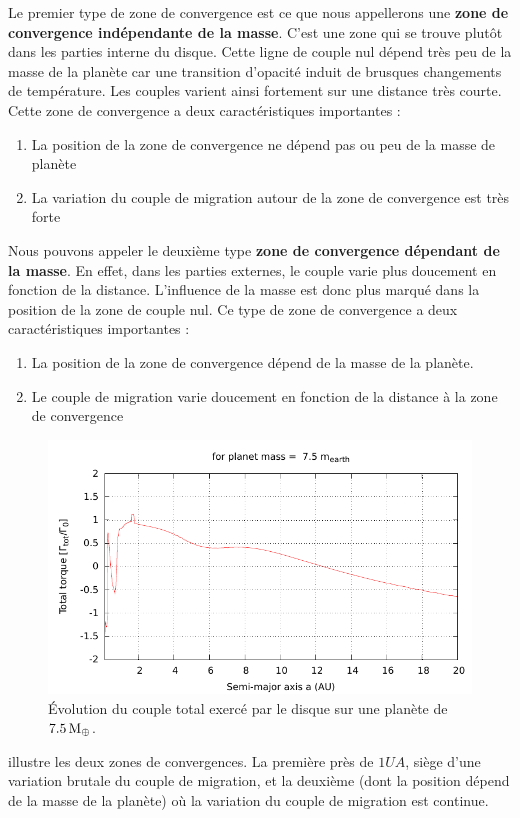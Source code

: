 Le premier type de zone de convergence est ce que nous appellerons une \textbf{zone de convergence indépendante de la masse}. C'est une
zone qui se trouve plutôt dans les parties interne du disque. Cette ligne de couple nul dépend très peu de la masse de la
planète car une transition d'opacité induit de brusques changements de température. Les couples varient ainsi fortement sur une
distance très courte. Cette zone de convergence a deux caractéristiques importantes : 
\begin{enumerate}
\item La position de la zone de convergence ne dépend pas ou peu de la masse de planète
\item La variation du couple de migration autour de la zone de convergence est très forte
\end{enumerate}

Nous pouvons appeler le deuxième type \textbf{zone de convergence dépendant de la masse}. En effet, dans les parties externes, le
couple varie plus doucement en fonction de la distance. L'influence de la masse est donc plus marqué dans la position de la zone
de couple nul. Ce type de zone de convergence a deux caractéristiques importantes : 
\begin{enumerate}
\item La position de la zone de convergence dépend de la masse de la planète. 
\item Le couple de migration varie doucement en fonction de la distance à la zone de convergence
\end{enumerate}

\begin{figure}[htb]
\centering
\includegraphics[width=0.75\linewidth]{figure/total_torque_fixed_m.pdf}
\caption{Évolution du couple total exercé par le disque sur une planète de $7.5\mathrm{\thinspace M_\oplus}$. }\label{fig:total_torque_fixed_m}
\end{figure}

 illustre les deux zones de convergences. La première près de $1\unit{UA}$, siège d'une
variation brutale du couple de migration, et la deuxième (dont la position dépend de la masse de la planète) où la variation du
couple de migration est continue. 

